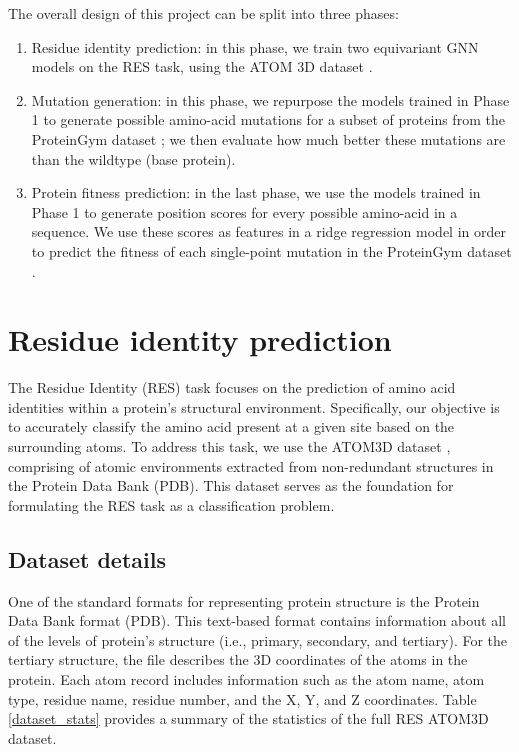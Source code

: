The overall design of this project can be split into three phases:

\begin{enumerate}
    \item Residue identity prediction: in this phase, we train two equivariant GNN models on the RES task, using the ATOM 3D dataset \cite{atom-3d}.
    \item Mutation generation: in this phase, we repurpose the models trained in Phase 1 to generate possible amino-acid mutations for a subset of proteins from the ProteinGym dataset \cite{tranception}; we then evaluate how much better these mutations are than the wildtype (base protein). 
    \item Protein fitness prediction: in the last phase, we use the models trained in Phase 1 to generate position scores for every possible amino-acid in a sequence. We use these scores as features in a ridge regression model in order to predict the fitness of each single-point mutation in the ProteinGym dataset \cite{tranception}.
\end{enumerate}

\section{Residue identity prediction}
The Residue Identity (RES) task focuses on the prediction of amino acid identities within a protein's structural environment. Specifically, our objective is to accurately classify the amino acid present at a given site based on the surrounding atoms. To address this task, we use the ATOM3D dataset \cite{atom-3d}, comprising of atomic environments extracted from non-redundant structures in the Protein Data Bank (PDB). This dataset serves as the foundation for formulating the RES task as a classification problem. 

\subsection{Dataset details}
One of the standard formats for representing protein structure is the Protein Data Bank format (PDB). This text-based format contains information about all of the levels of protein's structure (i.e., primary, secondary, and tertiary). For the tertiary structure, the file describes the 3D coordinates of the atoms in the protein. Each atom record includes information such as the atom name, atom type, residue name, residue number, and the X, Y, and Z coordinates. Table \ref{dataset_stats} provides a summary of the statistics of the full RES ATOM3D dataset.

